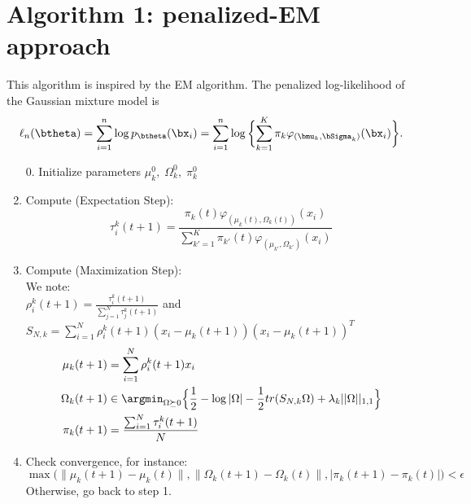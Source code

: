\section{Algorithm 1: penalized-EM approach}
This algorithm is inspired by the EM algorithm. The penalized log-likelihood of the Gaussian mixture model is
\begin{equation}\label{log-likelihood}
	\ell_n(\btheta)=\sum_{i=1}^{n}\log{p_{\btheta}(\bx_i)}=
	\sum_{i=1}^{n}\log\bigg\{{\sum_{k=1}^K\pi_k\varphi_{(\bmu_{k},\bSigma_{k})}(\bx_i)}\bigg\}.
\end{equation}

\begin{enumerate}
	\item[0.] Initialize parameters $\mu_k^0,\; \Omega_k^0,\;\pi_k^0$
	\item Compute (Expectation Step):
	      \begin{equation}
	      	\label{posteriorEM}
	      	\tau_i^k(t+1)=\frac{\pi_k(t) \varphi_{(\mu_k(t),\Omega_k(t))}(x_i)}{\sum_{k'=1}^K\pi_{k'}(t)\varphi_{(\mu_{k'},\Omega_{k'})}(x_i)}
	      \end{equation}

	\item Compute (Maximization Step):\\

	      We note:
	      \\$\rho^k_i(t+1)=\frac{\tau_i^k(t+1)}{\sum_{j=1}^N\tau_j^k(t+1)}$ and\\
	      $S_{N,k}=\sum_{i=1}^N \rho^k_i(t+1) (x_i-\mu_k(t+1))(x_i-\mu_k(t+1))^T$\\

	      \begin{align}
	      	\mu_k(t+1)    & =\sum_{i=1}^N \rho^k_i(t+1) x_i                                                                                                \\
	      	\Omega_k(t+1) & \in \argmin_{ \Omega\succeq 0} \Big\{ \frac{1}{2}-\log| \Omega |-\frac{1}{2} tr(S_{N,k}\Omega)+\lambda_k||\Omega||_{1,1}\Big\} \\
	      	\pi_k(t+1)    & =\frac{\sum_{i=1}^N\tau_i^k(t+1)}{N}
	      \end{align}
	\item Check convergence, for instance:\\
	      $\max\Big(\|\mu_k(t+1)-\mu_k(t)\|,\|\Omega_k(t+1)-\Omega_k(t)\|,|\pi_k(t+1)-\pi_k(t)|\Big)<\epsilon$
	      Otherwise, go back to step 1.
\end{enumerate}



